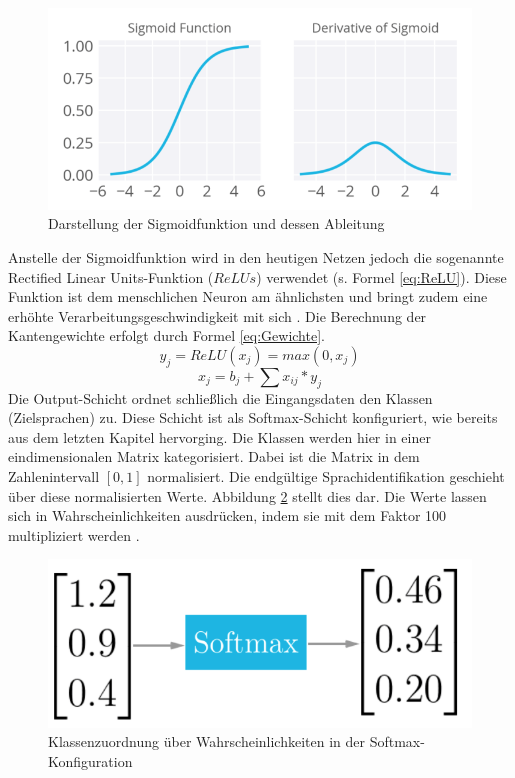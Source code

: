 \begin{figure}[h!]
	\centering
	\includegraphics[width=1.0\linewidth]{images/sigmund}
	\caption{Darstellung der Sigmoidfunktion und dessen Ableitung \cite{Kulbear.2017}} %
	\label{fig:features11.0}
\end{figure}
Anstelle der Sigmoidfunktion wird in den heutigen Netzen jedoch die sogenannte Rectified Linear Units-Funktion ($ReLUs$) verwendet (s. Formel \ref{eq:ReLU}). Diese Funktion ist dem menschlichen Neuron am ähnlichsten und bringt zudem eine erhöhte Verarbeitungsgeschwindigkeit mit sich \cite{zeiler.2013}. Die Berechnung der Kantengewichte erfolgt durch Formel \ref{eq:Gewichte}.
\begin{equation}
y_{j} = ReLU(x_{j}) = max(0,x_{j}) 
\label{eq:ReLU}
\end{equation}
\begin{equation}
x_{ j } = b_{ j } + \sum{ }{ }{ x_{ ij } * y_{j}}
\label{eq:Gewichte}
\end{equation}
Die Output-Schicht ordnet schließlich die Eingangsdaten den Klassen (Zielsprachen) zu. Diese Schicht ist als Softmax-Schicht konfiguriert, wie bereits aus dem letzten Kapitel hervorging. Die Klassen werden hier in einer eindimensionalen Matrix kategorisiert. Dabei ist die Matrix in dem Zahlenintervall $[0,1]$ normalisiert. Die endgültige Sprachidentifikation geschieht über diese normalisierten Werte. Abbildung \ref{fig:soft} stellt dies dar. Die Werte lassen sich in Wahrscheinlichkeiten ausdrücken, indem sie mit dem Faktor 100 multipliziert werden \cite{Kulbear.2017}.
\begin{figure}[h!]
	\centering
	\includegraphics[width=0.7\linewidth]{images/softmax}
	\caption{Klassenzuordnung über Wahrscheinlichkeiten in der Softmax-Konfiguration \cite{Kulbear.2017}} %
	\label{fig:soft}
\end{figure}
